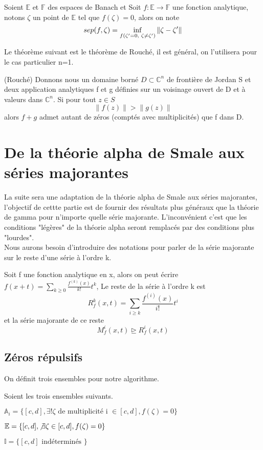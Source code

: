 \documentclass[a4paper,10.5pt]{article}
\begin{document}
	\begin{definition} Soient $\mathbb{E}$ et $\mathbb{F}$ des espaces de Banach et 
		Soit $f:\mathbb{E}\rightarrow \mathbb{F}$ une fonction analytique, notons $\zeta$ un point de $\mathbb{E}$ tel que $f(\zeta)=0$, alors on note
		\begin{equation}
		 sep(f,\zeta)=\inf_{f(\zeta '=0, \hspace{1mm} \zeta \neq \zeta ')}\left\|\zeta-\zeta '\right\|
		\end{equation}
		
	\end{definition}
	
	Le théorème suivant est le théorème de Rouché, il est général, on l'utilisera pour le cas particulier n=1.

	\begin{theorem}(Rouché) Donnons nous un domaine borné $D \subset \mathbb{C}^{n}$ de frontière de Jordan S et deux application analytiques f et g définies sur un voisinage ouvert de D et à valeurs dans $\mathbb{C}^n$. Si pour tout $z \in S$ 
		\[\left\|f(z)\right\|>\left\|g(z)\right\|\]
	alors $f+g$ admet autant de zéros (comptés avec multiplicités) que f dans D.
	\end{theorem}
	
	
	\section{De la théorie alpha de Smale aux séries majorantes}
	
	La suite sera une adaptation de la théorie alpha de Smale aux séries majorantes, l'objectif de cettte partie est de fournir des résultats plus généraux que la théorie de gamma pour n'importe quelle série majorante. L'inconvénient c'est que les conditions "légères" de la théorie alpha seront remplacés par des conditions plus "lourdes". \\
	Nous aurons besoin d'introduire des notations pour parler de la série majorante sur le reste d'une série à l'ordre k.
	
	\begin{definition} Soit f une fonction analytique en x, alors on peut écrire $f(x+t)=\sum_{k \geq 0} \frac{f^{(k)}(x)}{k!}t^{k}$, Le reste de la série à l'ordre k est 
	\[R_{f}^{k}(x,t)=\sum_{i \geq k} \frac{f^{(i)}(x)}{i!}t^{i}\]
	et la série majorante de ce reste
	\[M_{f}^{i}(x,t) \unrhd R_{f}^{i}(x,t)\]
	\end{definition}
	
	\subsection{Zéros répulsifs}
	On définit trois ensembles pour notre algorithme.
	\begin{definition} Soient les trois ensembles suivants.
		
	$\mathbb{A}_i=\{[c,d], \exists ! \zeta \text{ de multiplicité i } \in [c,d], f(\zeta)=0\}$
	
	$\mathbb{E}=\{[c,d], \not\exists \zeta \in [c,d], f(\zeta)=0\}$
	
	$\mathbb{I}=\{[c,d] \text{ indéterminés }\}$\\
	\end{definition}
\end{document}
